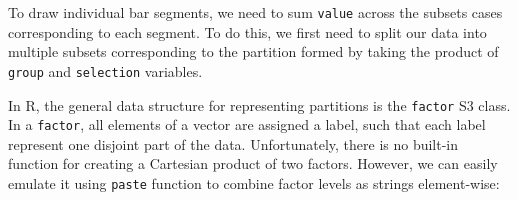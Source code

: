 \documentclass[
]{book}
\newenvironment{Shaded}{\begin{snugshade}}{\end{snugshade}}
\newcommand{\FunctionTok}[1]{\textcolor[rgb]{0.13,0.29,0.53}{\textbf{#1}}}
\newcommand{\NormalTok}[1]{#1}
\newcommand{\OtherTok}[1]{\textcolor[rgb]{0.56,0.35,0.01}{#1}}
\newcommand{\SpecialCharTok}[1]{\textcolor[rgb]{0.81,0.36,0.00}{\textbf{#1}}}
\theoremstyle{definition}
\theoremstyle{definition}
\theoremstyle{definition}
\theoremstyle{definition}
\theoremstyle{remark}
\begin{document}
To draw individual bar segments, we need to sum \texttt{value} across the subsets cases corresponding to each segment. To do this, we first need to split our data into multiple subsets corresponding to the partition formed by taking the product of \texttt{group} and \texttt{selection} variables.

In R, the general data structure for representing partitions is the \texttt{factor} S3 class. In a \texttt{factor}, all elements of a vector are assigned a label, such that each label represent one disjoint part of the data. Unfortunately, there is no built-in function for creating a Cartesian product of two factors. However, we can easily emulate it using \texttt{paste} function to combine factor levels as strings element-wise:

\begin{Shaded}
\end{Shaded}
\end{document}
